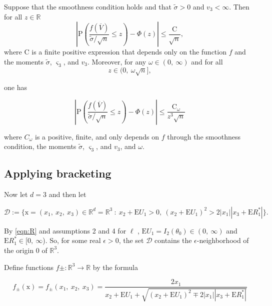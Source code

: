 \begin{theorem}\label{berryesseen}
	Suppose that the smoothness condition holds and that $\tilde{\sigma}>0$ and $v_{3}<\infty$. Then for all $z\in \mathbb{R}$
	\begin{equation}\label{berryesseen1}
		|\displaystyle \mathrm{P}(\frac{f(\overline{V})}{\tilde{\sigma}/\sqrt{n}}\leq z)-\Phi(z)|\leq\frac{\mathrm{C}}{\sqrt{n}},
	\end{equation}
	where $\mathrm{C}$ is a finite positive expression that depends only on the function $f$ and the moments $\tilde{\sigma}$, $\varsigma_{3}$, and $v_{3}$. Moreover, for any $\omega\in(0,\ \infty)$ and for all
	\begin{equation}\label{omega}
		z\in(0,\ \omega\sqrt{n}],
	\end{equation}
	
	one has
	
	\begin{equation}\label{berryesseen2}
		|\mathrm{P}(\frac{f(\overline{V})}{\tilde{\sigma}/\sqrt{n}}\leq z)-\Phi(z)|\leq\frac{\mathrm{C}_{\omega}}{z^{3}\sqrt{n}}
	\end{equation}
	
	where $C_{\omega}$ is a positive, finite, and only depends on $f$ through the smoothness condition, the moments $\tilde{\sigma}$, $\varsigma_{3}$, and $v_3$, and $\omega$.
\end{theorem}

\subsection*{Applying bracketing}

Now let $d=3$ and then let

$$\mathcal{D} :=\{\mathrm{x}=(x_{1},\ x_{2},\ x_{3})\in \mathbb{R}^{d}=\mathbb{R}^{3}\ :\ x_{2}+\mathrm{E}U_{1}>0,\ (x_{2}+\mathrm{E}U_{1})^{2}>2|x_{1}||x_{3}+\mathrm{E}R_{1}^{*}|\}.$$

By \eqref{eqn:R} and assumptions 2 and 4 for $\ell$ , $\mathrm{E}U_{1}=I_2(\theta_{0})\in(0,\ \infty)$ and $\mathrm{E}R_{1}^{*}\in[0,\ \infty$). So, for some real $\epsilon>0$, the set $\mathcal{D}$ contains the $\epsilon$-neighborhood of the origin $0$ of $\mathbb{R}^{3}.$

Define functions $f\pm:\mathbb{R}^{3}\rightarrow \mathbb{R}$ by the formula

\begin{equation}\label{definef}
	f_{\pm}(\displaystyle \mathrm{x})=f_{\pm}(x_{1},\ x_{2},\ x_{3})=\frac{2x_{1}}{x_{2}+\mathrm{E}U_{1}+\sqrt{(x_{2}+\mathrm{E}U_{1})^{2}\mp 2|x_{1}||x_{3}+\mathrm{E}R_{1}^{*}|}}
\end{equation}

